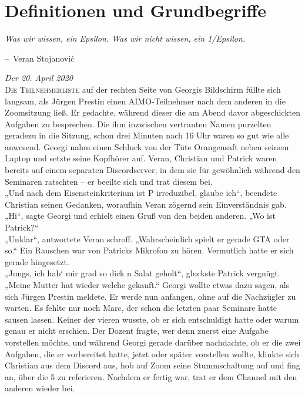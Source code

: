 \documentclass[oneside]{memoir}
\makeatletter
\newenvironment{chapquote}[2][2em]
  {\setlength{\@tempdima}{#1}%
   \def\chapquote@author{#2}%
   \parshape 1 \@tempdima \dimexpr\textwidth-2\@tempdima\relax%
   \itshape}
  {\par\normalfont\hfill--\ \chapquote@author\hspace*{\@tempdima}\par\bigskip}
\makeatother
\begin{document}
\chapter{Definitionen und Grundbegriffe} %
\begin{chapquote}{Veran Stojanović}
\glqq Was wir wissen, ein Epsilon. Was wir nicht wissen, ein 1/Epsilon.\grqq
\end{chapquote}
\textit{Der 20. April 2020} \\ 
\lettrine{D}{ie Teilnehmerliste} auf der rechten Seite von Georgis Bildschirm füllte sich langsam, als Jürgen Prestin einen AIMO-Teilnehmer nach dem anderen in die Zoomsitzung ließ. Er gedachte, während dieser die am Abend davor abgeschickten Aufgaben zu besprechen. Die ihm inzwischen vertrauten Namen purzelten geradezu in die Sitzung, schon drei Minuten nach 16 Uhr waren so gut wie alle anwesend. Georgi nahm einen Schluck von der Tüte Orangensaft neben seinem Laptop und setzte seine Kopfhörer auf. Veran, Christian und Patrick waren bereits auf einem separaten Discordserver, in dem sie für gewöhnlich während den Seminaren ratschten – er beeilte sich und trat diesem bei. \\
„Und nach dem Eisensteinkriterium ist P irreduzibel, glaube ich“, beendete Christian seinen Gedanken, woraufhin Veran zögernd sein Einverständnis gab. \\
„Hi“, sagte Georgi und erhielt einen Gruß von den beiden anderen. „Wo ist Patrick?“ \\
„Unklar“, antwortete Veran schroff. „Wahrscheinlich spielt er gerade GTA oder so.“
Ein Rauschen war von Patricks Mikrofon zu hören. Vermutlich hatte er sich gerade hingesetzt. \\ 
„Jungs, ich hab‘ mir grad so dick n Salat geholt“, gluckste Patrick vergnügt. „Meine Mutter hat wieder welche gekauft.“
Georgi wollte etwas dazu sagen, als sich Jürgen Prestin meldete. Er werde nun anfangen, ohne auf die Nachzügler zu warten. Es fehlte nur noch Marc, der schon die letzten paar Seminare hatte sausen lassen. Keiner der vieren wusste, ob er sich entschuldigt hatte oder warum genau er nicht erschien. Der Dozent fragte, wer denn zuerst eine Aufgabe vorstellen möchte, und während Georgi gerade darüber nachdachte, ob er die zwei Aufgaben, die er vorbereitet hatte, jetzt oder später vorstellen wollte, klinkte sich Christian aus dem Discord aus, hob auf Zoom seine Stummschaltung auf und fing an, über die 5 zu referieren. 
Nachdem er fertig war, trat er dem Channel mit den anderen wieder bei.  \\
\end{document}
